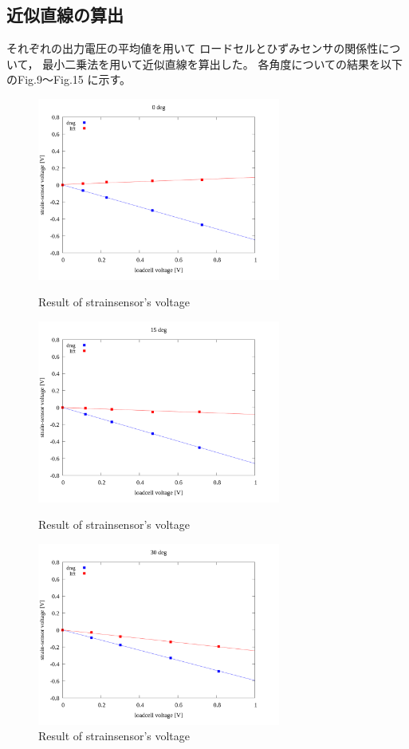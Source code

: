 \documentclass[twocolumn,a4j]{jsarticle}
\begin{document}
\subsection{近似直線の算出}
それぞれの出力電圧の平均値を用いて
ロードセルとひずみセンサの関係性について，
最小二乗法を用いて近似直線を算出した。
各角度についての結果を以下のFig.9～Fig.15 に示す。
\begin{figure}[htbp]
    \footnotesize
    \begin{center}
        \includegraphics[width=80mm]{../images/0_linear.png}
        \caption{Result of strainsensor's voltage}
        \includegraphics[width=80mm]{../images/15_linear.png}
        \caption{Result of strainsensor's voltage}
        \includegraphics[width=80mm]{../images/30_linear.png}
        \caption{Result of strainsensor's voltage}
    \end{center}
\end{figure}
\end{document}
